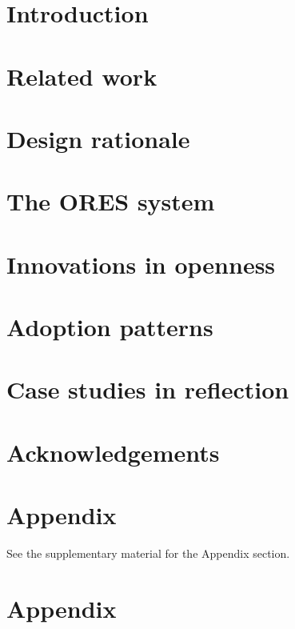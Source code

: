 \section{Introduction}
\label{sec:introduction}


\section{Related work}
\label{sec:related_work}


\section{Design rationale}
\label{sec:design_rationale}


\section{The ORES system}
\label{sec:the_ores_system}


\section{Innovations in openness}
\label{sec:innovations_in_openness}


\section{Adoption patterns}
\label{sec:adoption_patterns}


\section{Case studies in reflection}
\label{sec:case_studies}


\section{Acknowledgements}
\label{sec:acknowledgements}


\section{Appendix}
See the supplementary material for the Appendix section.




\pagebreak
\appendix
\section{Appendix}
\label{sec:appendix}

